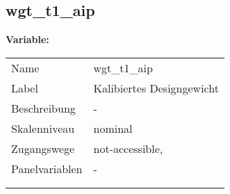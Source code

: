 	
	
	\subsection{wgt\_t1\_aip}
	\label{subSection:wgt_t1_aip}

	\noindent\textbf{Variable:}\\
		\begin{tabular}{lL{11.3cm}}
			\label{tableVariable:wgt_t1_aip}
			Name & wgt\_t1\_aip \\
			Label & Kalibiertes Designgewicht \\
			Beschreibung & - \\
			Skalenniveau & nominal \\
			Zugangswege &
				not-accessible,
 \\
			Panelvariablen & -
			 \\
			 \\
 \\
		\end{tabular}






	
	\newpage
